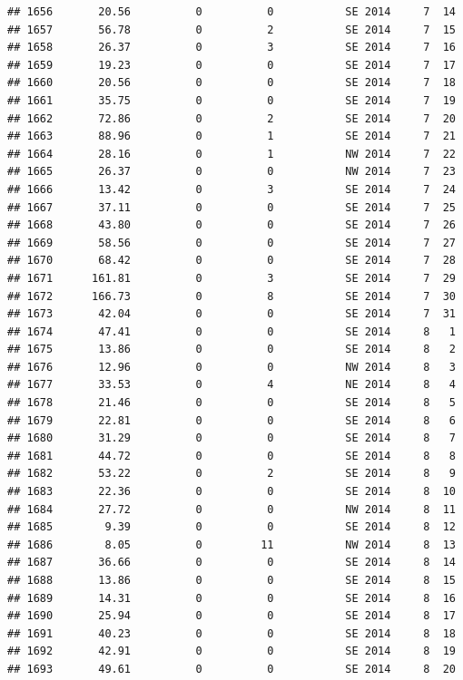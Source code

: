 \documentclass[
]{article}
\begin{document}
\begin{verbatim}
## 1656       20.56          0          0           SE 2014     7  14
## 1657       56.78          0          2           SE 2014     7  15
## 1658       26.37          0          3           SE 2014     7  16
## 1659       19.23          0          0           SE 2014     7  17
## 1660       20.56          0          0           SE 2014     7  18
## 1661       35.75          0          0           SE 2014     7  19
## 1662       72.86          0          2           SE 2014     7  20
## 1663       88.96          0          1           SE 2014     7  21
## 1664       28.16          0          1           NW 2014     7  22
## 1665       26.37          0          0           NW 2014     7  23
## 1666       13.42          0          3           SE 2014     7  24
## 1667       37.11          0          0           SE 2014     7  25
## 1668       43.80          0          0           SE 2014     7  26
## 1669       58.56          0          0           SE 2014     7  27
## 1670       68.42          0          0           SE 2014     7  28
## 1671      161.81          0          3           SE 2014     7  29
## 1672      166.73          0          8           SE 2014     7  30
## 1673       42.04          0          0           SE 2014     7  31
## 1674       47.41          0          0           SE 2014     8   1
## 1675       13.86          0          0           SE 2014     8   2
## 1676       12.96          0          0           NW 2014     8   3
## 1677       33.53          0          4           NE 2014     8   4
## 1678       21.46          0          0           SE 2014     8   5
## 1679       22.81          0          0           SE 2014     8   6
## 1680       31.29          0          0           SE 2014     8   7
## 1681       44.72          0          0           SE 2014     8   8
## 1682       53.22          0          2           SE 2014     8   9
## 1683       22.36          0          0           SE 2014     8  10
## 1684       27.72          0          0           NW 2014     8  11
## 1685        9.39          0          0           SE 2014     8  12
## 1686        8.05          0         11           NW 2014     8  13
## 1687       36.66          0          0           SE 2014     8  14
## 1688       13.86          0          0           SE 2014     8  15
## 1689       14.31          0          0           SE 2014     8  16
## 1690       25.94          0          0           SE 2014     8  17
## 1691       40.23          0          0           SE 2014     8  18
## 1692       42.91          0          0           SE 2014     8  19
## 1693       49.61          0          0           SE 2014     8  20

\end{verbatim}
\end{document}
